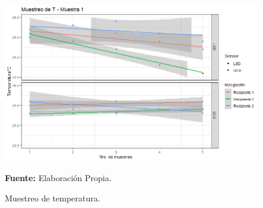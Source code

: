 \begin{figure}[H]
        \centering
        \includegraphics[width=0.7\linewidth]{Imagenes/cap4/T_M1.png}
        \caption {Muestreo de temperatura. }{\textbf{Fuente:}
        Elaboraci\'on Propia. }
        \label{fig:M1T}
    \end{figure}
    
